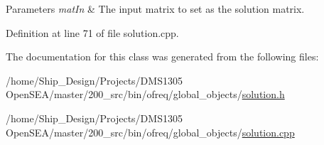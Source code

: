 \begin{DoxyParams}{Parameters}
{\em mat\-In} & The input matrix to set as the solution matrix. \\
\hline
\end{DoxyParams}


Definition at line 71 of file solution.\-cpp.



The documentation for this class was generated from the following files\-:\begin{DoxyCompactItemize}
\item 
/home/\-Ship\-\_\-\-Design/\-Projects/\-D\-M\-S1305 Open\-S\-E\-A/master/200\-\_\-src/bin/ofreq/global\-\_\-objects/\hyperlink{solution_8h}{solution.\-h}\item 
/home/\-Ship\-\_\-\-Design/\-Projects/\-D\-M\-S1305 Open\-S\-E\-A/master/200\-\_\-src/bin/ofreq/global\-\_\-objects/\hyperlink{solution_8cpp}{solution.\-cpp}\end{DoxyCompactItemize}
